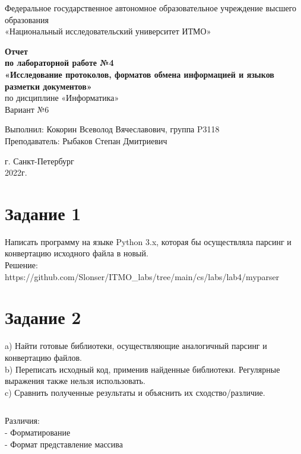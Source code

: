 \documentclass[12pt,onecolumn]{article}
\begin{document}
\begin{center}
    Федеральное государственное автономное образовательное учреждение высшего образования\\
	«Национальный исследовательский университет ИТМО»
\end{center}
\vspace{1cm}
\setcounter{page}{0} 
\begin{center}
    \large \textbf{Отчет}\\
    \textbf{по лабораторной работе №4}\\
    \large \textbf{«Исследование протоколов, форматов обмена информацией и языков разметки документов»}\\
     по дисциплине «Информатика»\\
	\vspace{1cm}
    Вариант №6\\
\end{center}

\vspace{10cm}
\begin{flushright}
  Выполнил: Кокорин Всеволод Вячеславович, группа P3118\\
  Преподаватель: Рыбаков Степан Дмитриевич\\
\end{flushright}

\vspace{5cm}
\begin{center}
    г. Санкт-Петербург\\
    2022г.
\end{center}
\thispagestyle{empty}
\newpage
\tableofcontents
\newpage
\section{Задание 1}
Написать программу на языке Python 3.x, которая бы осуществляла парсинг и конвертацию исходного файла в новый. \\
Решение: \\
https://github.com/Slonser/ITMO\_labs/tree/main/cs/labs/lab4/myparser
\newpage
\section{Задание 2}
a) Найти готовые библиотеки, осуществляющие аналогичный парсинг и конвертацию файлов. \\
b) Переписать исходный код, применив найденные библиотеки. Регулярные выражения также нельзя использовать. \\
c) Сравнить полученные результаты и объяснить их сходство/различие. \\
\inputminted{python}{trash/1}
Различия:\\
- Форматирование \\
- Формат представление массива \\
\newpage
\end{document}
